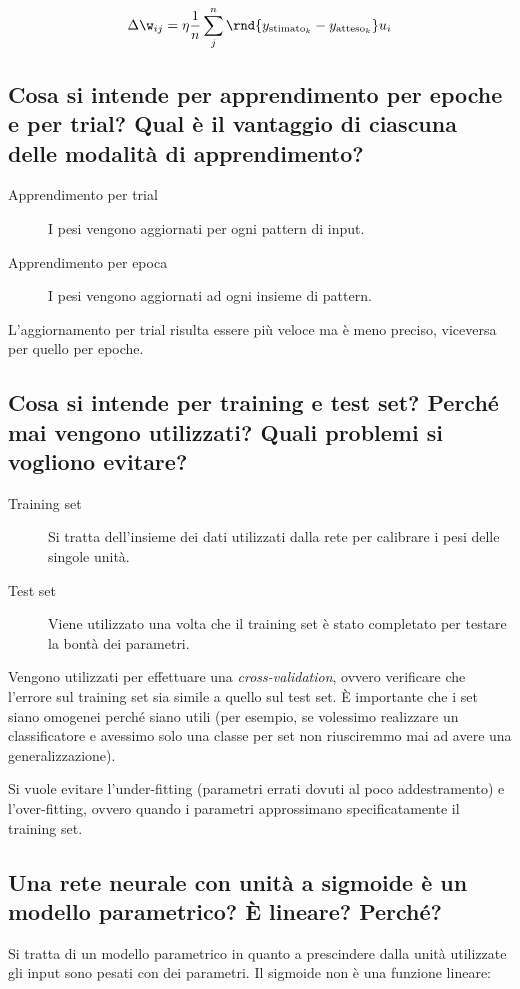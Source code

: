 \documentclass[\main/main.tex]{subfiles}
\begin{document}
\[
  \Delta \w_{ij} = \eta \frac{1}{n}\sum_{j}^n \rnd{y_{\text{stimato}_k} - y_{\text{atteso}_k}}u_i
\]

\subsection{Cosa si intende per apprendimento per epoche e per trial? Qual è il vantaggio di ciascuna delle modalità di apprendimento?}
\begin{description}
  \item[Apprendimento per trial] I pesi vengono aggiornati per ogni pattern di input.
  \item[Apprendimento per epoca] I pesi vengono aggiornati ad ogni insieme di pattern.
\end{description}

L'aggiornamento per trial risulta essere più veloce ma è meno preciso, viceversa per quello per epoche.

\subsection{Cosa si intende per training e test set? Perché mai vengono utilizzati? Quali problemi si vogliono evitare?}
\begin{description}
  \item[Training set] Si tratta dell'insieme dei dati utilizzati dalla rete per calibrare i pesi delle singole unità.
  \item[Test set] Viene utilizzato una volta che il training set è stato completato per testare la bontà dei parametri.
\end{description}

Vengono utilizzati per effettuare una \textit{cross-validation}, ovvero verificare che l'errore sul training set sia simile a quello sul test set. È importante che i set siano omogenei perché siano utili (per esempio, se volessimo realizzare un classificatore e avessimo solo una classe per set non riusciremmo mai ad avere una generalizzazione).

Si vuole evitare l'under-fitting (parametri errati dovuti al poco addestramento) e l'over-fitting, ovvero quando i parametri approssimano specificatamente il training set.

\subsection{Una rete neurale con unità a sigmoide è un modello parametrico? È lineare? Perché?}
Si tratta di un modello parametrico in quanto a prescindere dalla unità utilizzate gli input sono pesati con dei parametri. Il sigmoide non è una funzione lineare:
\end{document}
